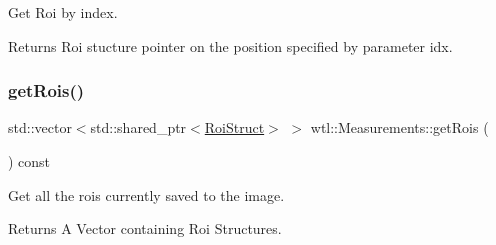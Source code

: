 Get Roi by index. 

\begin{DoxyReturn}{Returns}
Roi stucture pointer on the position specified by parameter idx. 
\end{DoxyReturn}
\mbox{\label{classwtl_1_1_measurements_a3e618f3c6ab36634fb4c01106a89b3fd}} 
\subsubsection{\texorpdfstring{get\+Rois()}{getRois()}}
{\footnotesize\ttfamily std\+::vector$<$std\+::shared\+\_\+ptr$<$\hyperlink{structwtl_1_1_roi_struct}{Roi\+Struct}$>$ $>$ wtl\+::\+Measurements\+::get\+Rois (\begin{DoxyParamCaption}{ }\end{DoxyParamCaption}) const}



Get all the rois currently saved to the image. 

\begin{DoxyReturn}{Returns}
A Vector containing Roi Structures. 
\end{DoxyReturn}
